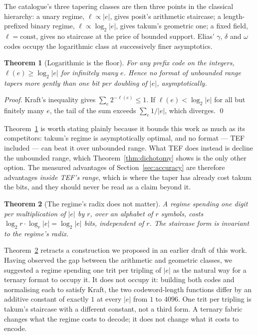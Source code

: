 \documentclass[11pt]{article}
\newtheorem{theorem}{Theorem}
\theoremstyle{definition}
\begin{document}
The catalogue's three tapering classes are then three points in the classical
hierarchy: a unary regime, $\ell \propto |e|$, gives posit's arithmetic
staircase; a length-prefixed binary regime, $\ell \propto \log_2|e|$, gives
takum's geometric one; a fixed field, $\ell = \mathrm{const}$, gives no staircase
at the price of bounded support. Elias' $\gamma$, $\delta$ and $\omega$ codes
occupy the logarithmic class at successively finer asymptotics.

\begin{theorem}[Logarithmic is the floor]
\label{thm:floor}
For any prefix code on the integers, $\ell(e) \geq \log_2|e|$ for infinitely many
$e$. Hence no format of unbounded range tapers more gently than one bit per
doubling of $|e|$, asymptotically.
\end{theorem}

\begin{proof}
Kraft's inequality gives $\sum_e 2^{-\ell(e)} \leq 1$. If $\ell(e) < \log_2|e|$
for all but finitely many $e$, the tail of the sum exceeds
$\sum_e 1/|e|$, which diverges. \qed
\end{proof}

Theorem~\ref{thm:floor} is worth stating plainly because it bounds this work as
much as its competitors: takum's regime is asymptotically optimal, and no format
--- TEF included --- can beat it over unbounded range. What TEF does instead is
decline the unbounded range, which Theorem~\ref{thm:dichotomy} shows is the only
other option. The measured advantages of Section~\ref{sec:accuracy} are therefore
advantages \emph{inside TEF's range}, which is where the taper has already cost
takum the bits, and they should never be read as a claim beyond it.

\begin{theorem}[The regime's radix does not matter]
\label{thm:radixinv}
A regime spending one digit per multiplication of $|e|$ by $r$, over an alphabet
of $r$ symbols, costs $\log_2 r \cdot \log_r |e| = \log_2 |e|$ bits, independent
of $r$. The staircase form is invariant to the regime's radix.
\end{theorem}

Theorem~\ref{thm:radixinv} retracts a construction we proposed in an earlier draft
of this work. Having observed the gap between the arithmetic and geometric
classes, we suggested a regime spending one trit per tripling of $|e|$ as the
natural way for a ternary format to occupy it. It does not occupy it: building
both codes and normalising each to satisfy Kraft, the two codeword-length
functions differ by an additive constant of exactly $1$ at every $|e|$ from $1$ to
$4096$. One trit per tripling is takum's staircase with a different constant, not
a third form. A ternary fabric changes what the regime costs to decode; it does
not change what it costs to encode.
\end{document}
